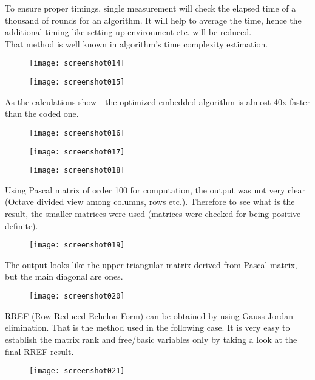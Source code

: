 \documentclass[eng,openany]{mgr}
\begin{document}
To ensure proper timings, single measurement will check the elapsed time of a thousand of rounds for an algorithm. It will help to average the time, hence the additional timing like setting up environment etc. will be reduced. \\
That method is well known in algorithm's time complexity estimation.
\begin{figure}[h]
\centering
\texttt{[image: screenshot014]}
\label{fig:screenshot014}
\end{figure}
\begin{figure}[h]
\centering
\texttt{[image: screenshot015]}
\label{fig:screenshot015}
\end{figure}

As the calculations show - the optimized embedded algorithm is almost 40x faster than the coded one.
\newpage
\begin{figure}[h]
\centering
\texttt{[image: screenshot016]}

\label{fig:screenshot016}
\end{figure}
\begin{figure}[h]
\centering
\texttt{[image: screenshot017]}
\label{fig:screenshot017}
\end{figure}
\newpage
\begin{figure}[h]
\centering
\texttt{[image: screenshot018]}
\end{figure}
Using Pascal matrix of order 100 for computation, the output was not very clear (Octave divided view among columns, rows etc.).
Therefore to see what is the result, the smaller matrices were used (matrices were checked for being positive definite).

\begin{figure}[h]
\centering
\texttt{[image: screenshot019]}
\caption{}
\end{figure}
The output looks like the upper triangular matrix derived from Pascal matrix, but the main diagonal are ones.
\newpage
\begin{figure}[h]
\centering
\texttt{[image: screenshot020]}
\label{fig:screenshot020}
\end{figure}

RREF (Row Reduced Echelon Form) can be obtained by using Gauss-Jordan elimination. That is the method used in the following case.
It is very easy to establish the matrix rank and free/basic variables only by taking a look at the final RREF result.
\begin{figure}[h]
\centering
\texttt{[image: screenshot021]}
\label{fig:screenshot021}
\end{figure}
\end{document}
